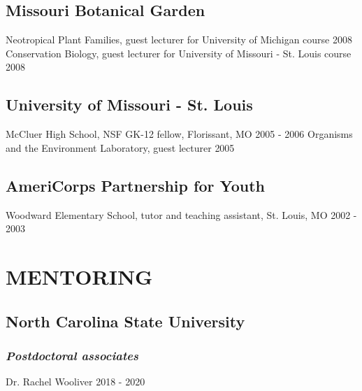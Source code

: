 \documentclass[11pt,english]{article}\usepackage[]{graphicx}\usepackage[]{xcolor}
\begin{document}
\subsection*{Missouri Botanical Garden}
Neotropical Plant Families, guest lecturer for University of Michigan course \hfill {2008} \newline
Conservation Biology, guest lecturer for University of Missouri - St. Louis course \hfill {2008} 

\subsection*{University of Missouri - St. Louis}
McCluer High School, NSF GK-12 fellow, Florissant, MO \hfill {2005 - 2006} \newline
Organisms and the Environment Laboratory, guest lecturer \hfill {2005} 

\subsection*{AmeriCorps Partnership for Youth}
Woodward Elementary School, tutor and teaching assistant, St. Louis, MO \hfill {2002 - 2003} 

\section*{MENTORING}


\subsection*{North Carolina State University}

\subsubsection*{\emph{Postdoctoral associates}}
Dr. Rachel Wooliver \hfill {2018 - 2020}
\end{document}
